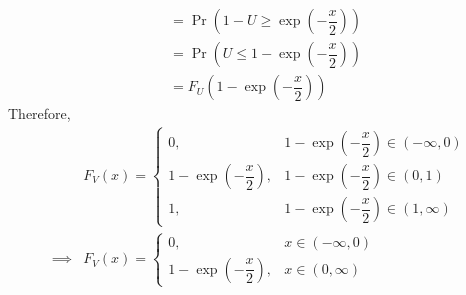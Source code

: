 \documentclass[journal,12pt,twocolumn]{IEEEtran}
\numberwithin{equation}{section}
\renewcommand\thesection{\arabic{section}}
\providecommand{\pr}[1]{\ensuremath{\Pr\left(#1\right)}}
\begin{document}
\begin{enumerate}[label=\thesection.\arabic*,ref=\thesection.\theenumi]
\begin{align}
              \\
                     & = \pr{1-U \geq	\exp{\left(-\dfrac{x}{2}\right)}}
              \\
                     & = \pr{U \leq 1 - \exp{\left(-\dfrac{x}{2}\right)}}
              \\
                     & = F_U\left(1 - \exp{\left(-\dfrac{x}{2}\right)}\right)
          \end{align}
          Therefore,
          \begin{align}
                       & F_V(x) =
              \begin{cases}
                  0,                                    & 1 - \exp{\left(-\dfrac{x}{2}\right)} \in (-\infty,0)
                  \\
                  1 - \exp{\left(-\dfrac{x}{2}\right)}, & 1 - \exp{\left(-\dfrac{x}{2}\right)} \in (0,1)
                  \\
                  1,                                    & 1 - \exp{\left(-\dfrac{x}{2}\right)} \in (1, \infty)
              \end{cases}
              \\
              \implies & F_V(x) =
              \begin{cases}
                  0,                                    & x \in (-\infty,0)
                  \\
                  1 - \exp{\left(-\dfrac{x}{2}\right)}, & x \in (0,\infty)
              \end{cases}
          \end{align}
\end{enumerate}
\end{document}
